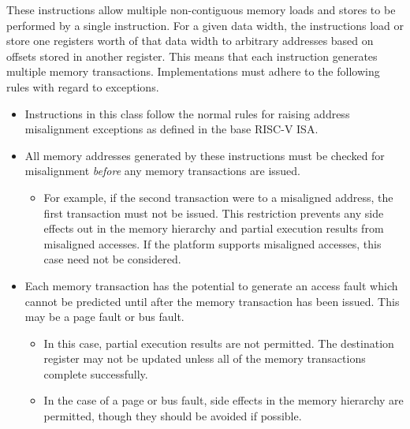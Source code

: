 These instructions allow multiple non-contiguous memory loads and stores
to be performed by a single instruction.
For a given data width, the instructions load or store one registers
worth of that data width to arbitrary addresses based on offsets stored
in another register.
This means that each instruction generates multiple memory transactions.
Implementations must adhere to the following rules with regard
to exceptions.
\begin{itemize}
\item Instructions in this class follow the normal rules for raising
    address misalignment exceptions as defined in the base RISC-V ISA.
\item All memory addresses generated by these instructions must
    be checked for misalignment {\em before} any memory transactions are
    issued.
\begin{itemize} \item
    For example, if the second transaction were to a misaligned address,
    the first transaction must not be issued.
    This restriction prevents any side effects out in the memory hierarchy
    and partial execution results from misaligned accesses.
    If the platform supports misaligned accesses, this case need not
    be considered.
\end{itemize}
\item Each memory transaction has the potential to generate an access
    fault which cannot be predicted until after the memory transaction
    has been issued.
    This may be a page fault or bus fault.
\begin{itemize}
\item In this case, partial execution results are not permitted.
    The destination register may not be updated unless all of the
    memory transactions complete successfully.
\item In the case of a page or bus fault, side effects in the
    memory hierarchy are permitted, though they should be avoided if
    possible.
\end{itemize}
\end{itemize}



